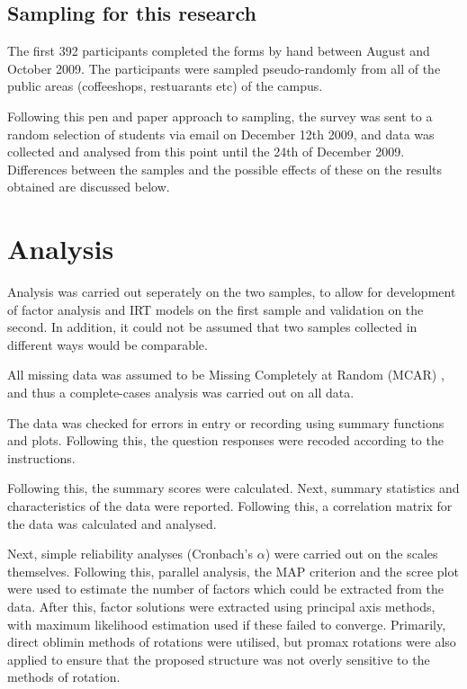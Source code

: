 \documentclass{article}
\begin{document}
\subsection{Sampling for this research}
\label{sec:sampl-this-rese}
The first 392 participants completed the forms by hand between August and October 2009. The participants were sampled pseudo-randomly from all of the public areas (coffeeshops, restuarants etc) of the campus.

Following this pen and paper approach to sampling, the survey was sent to a random selection of students via email on December 12th 2009, and data was collected and analysed from this point until the 24th of December 2009. Differences between the samples and the possible effects of these on the results obtained are discussed below. %

\section{Analysis}
Analysis was carried out seperately on the two samples, to allow for development of factor analysis and IRT models on the first sample and validation on the second. In addition, it could not be assumed that two samples collected in different ways would be comparable. 


All missing data was assumed to be Missing Completely at Random (MCAR) \cite{little1987statistical}, and thus a complete-cases analysis was carried out on all data. 

The data was checked for errors in entry or recording using summary functions and plots. Following this, the question responses were recoded according to the instructions.

Following this, the summary scores were calculated. Next, summary statistics and characteristics of the data were reported. 
Following this, a correlation matrix for the data was calculated and analysed.



Next, simple reliability analyses (Cronbach's $\alpha$) were carried out on the scales themselves. Following this, parallel analysis, the MAP criterion and the scree plot were used to estimate the number of factors which could be extracted from the data. After this, factor solutions were extracted using principal axis methods, with maximum likelihood estimation used if these failed to converge. Primarily, direct oblimin methods of rotations were utilised, but promax rotations were also applied to ensure that the proposed structure was not overly sensitive to the methods of rotation.
\end{document}
